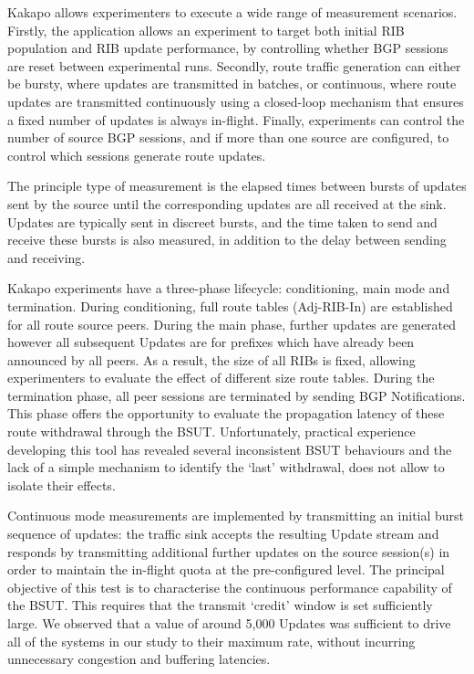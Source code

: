 
Kakapo allows experimenters to execute a wide range of measurement scenarios.
Firstly, the application allows an experiment to target both initial RIB population and RIB update performance, by controlling whether BGP sessions are reset between experimental runs.
Secondly, route traffic generation can either be bursty, where updates are transmitted in batches, or continuous, where route updates are transmitted continuously using a closed-loop mechanism that ensures a fixed number of updates is always in-flight.
Finally, experiments can control the number of source BGP sessions, and if more than one source are configured, to control which sessions generate route updates.

The principle type of measurement is the elapsed times between bursts of updates
sent by the source until the corresponding updates are all received at the
sink.  Updates are typically sent in discreet bursts, and the time taken to
send and receive these bursts is also measured, in addition to the delay
between sending and receiving.

Kakapo experiments have a three-phase lifecycle:
conditioning, main mode and termination.  During conditioning,
full route tables (Adj-RIB-In) are established for all route source
peers. During the main phase, further updates are generated however all subsequent
Updates are for prefixes which have already been announced by all peers.
As a result, the size of all RIBs is fixed, allowing
experimenters to evaluate the effect of different size route tables.
During the termination phase, all peer sessions are terminated by sending BGP
Notifications.  This phase offers the opportunity to evaluate the propagation
latency of these route withdrawal through the BSUT. Unfortunately, practical
experience developing this tool has revealed several inconsistent
BSUT behaviours and the lack of a simple mechanism to identify the `last'
withdrawal, does not allow to isolate their effects.

Continuous mode measurements are implemented by transmitting an
initial burst sequence of updates: the traffic sink accepts the resulting
Update stream and responds by transmitting additional further updates on the
source session(s) in order to maintain the in-flight quota at the
pre-configured level.  The principal objective of this test is to characterise
the continuous performance capability of the BSUT.  This requires that the
transmit `credit' window is set sufficiently large.  We observed that a value
of around 5,000 Updates was sufficient to drive all of the systems in our study
to their maximum rate, without incurring unnecessary congestion and buffering
latencies.

